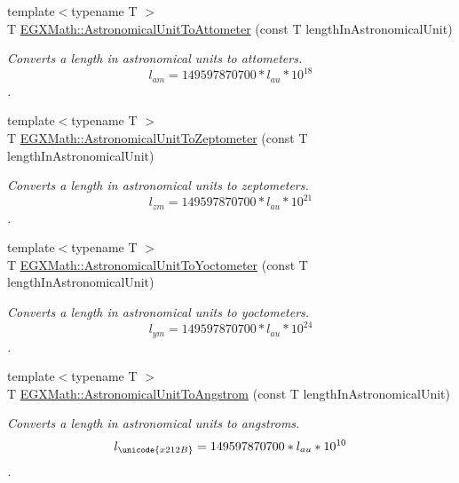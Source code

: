 \begin{DoxyCompactItemize}
{\footnotesize template$<$typename T $>$ }\\T \mbox{\hyperlink{group___e_g_x_math-_conversions-_length_conversions-_astronomical-_astronomical_unit-_s_i_ga6a7dd29c7c91e4ec30e4bb2fe7110210}{E\+G\+X\+Math\+::\+Astronomical\+Unit\+To\+Attometer}} (const T length\+In\+Astronomical\+Unit)
\begin{DoxyCompactList}\small\item\em Converts a length in astronomical units to attometers. \[ l_{am}=149597870700 * l_{au} * 10^{18} \]. \end{DoxyCompactList}\item 
{\footnotesize template$<$typename T $>$ }\\T \mbox{\hyperlink{group___e_g_x_math-_conversions-_length_conversions-_astronomical-_astronomical_unit-_s_i_ga1b83999f8a97d59122f34bd7af3c6cf5}{E\+G\+X\+Math\+::\+Astronomical\+Unit\+To\+Zeptometer}} (const T length\+In\+Astronomical\+Unit)
\begin{DoxyCompactList}\small\item\em Converts a length in astronomical units to zeptometers. \[ l_{zm}=149597870700 * l_{au} * 10^{21} \]. \end{DoxyCompactList}\item 
{\footnotesize template$<$typename T $>$ }\\T \mbox{\hyperlink{group___e_g_x_math-_conversions-_length_conversions-_astronomical-_astronomical_unit-_s_i_gab3a722bc0fc1b42aeeec0683351a3181}{E\+G\+X\+Math\+::\+Astronomical\+Unit\+To\+Yoctometer}} (const T length\+In\+Astronomical\+Unit)
\begin{DoxyCompactList}\small\item\em Converts a length in astronomical units to yoctometers. \[ l_{ym}=149597870700 * l_{au} * 10^{24} \]. \end{DoxyCompactList}\item 
{\footnotesize template$<$typename T $>$ }\\T \mbox{\hyperlink{group___e_g_x_math-_conversions-_length_conversions-_astronomical-_astronomical_unit-_non-_s_i_ga5efd14d5ca13719b7e06c4614ac0faba}{E\+G\+X\+Math\+::\+Astronomical\+Unit\+To\+Angstrom}} (const T length\+In\+Astronomical\+Unit)
\begin{DoxyCompactList}\small\item\em Converts a length in astronomical units to angstroms. \[ l_{\unicode{x212B}}=149597870700 * l_{au} * 10^{10} \]. \end{DoxyCompactList}\item 

\end{DoxyCompactItemize}
